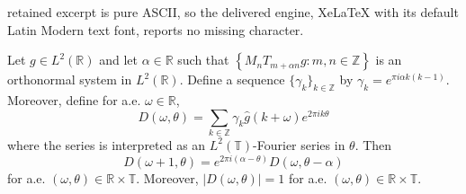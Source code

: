 \documentclass[10pt,a4paper]{amsart}
\def\R{{\mathbb R}}
\def\T{{\mathbb T}}
\def\Z{{\mathbb Z}}
\newcommand{\lt}{{L^2(\R)}}
\begin{document}
retained excerpt is pure ASCII, so the delivered engine, XeLaTeX with its default Latin Modern text font, reports no missing character.
\begin{lemma}\label{lem:direct-fibre-form}
Let $g \in \lt$ and let $\alpha \in \R$ such that $\left\{M_nT_{m+\alpha n}g:m,n\in\mathbb Z\right\}$ is an orthonormal system in $L^2(\R)$. Define a sequence $\{ \gamma_k \}_{k \in \Z}$ by $\gamma_k=e^{\pi i\alpha k(k-1)}$. Moreover, define for a.e. $\omega\in\mathbb R$,
$$
D(\omega,\theta) = \sum_{k\in\mathbb Z} \gamma_k\widehat g(k+\omega)e^{2\pi i k\theta}
$$
where the series is interpreted as an $L^2(\T)$-Fourier series in $\theta$. Then 
\begin{equation}\label{eq:direct-fibre-covariance}
D(\omega+1,\theta) = e^{2\pi i(\alpha-\theta)}D(\omega,\theta-\alpha)
\end{equation}
for a.e. $(\omega,\theta) \in \R \times \T$.
Moreover, $|D(\omega,\theta)|=1$ for a.e. $(\omega,\theta)\in\mathbb R\times\T$.
\end{lemma}
\end{document}

